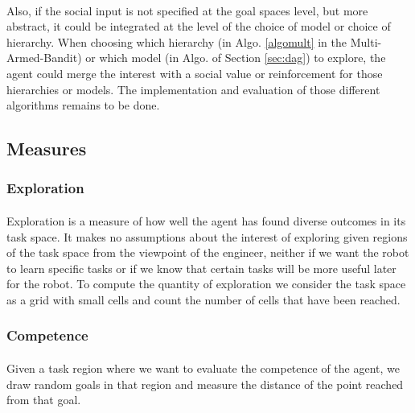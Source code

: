 \documentclass[12pt]{article}
\begin{document}
			\paragraph{}
			Also, if the social input is not specified at the goal spaces level, but more abstract, it could be integrated at the level of the choice of model or choice of hierarchy. 
			When choosing which hierarchy (in Algo. \ref{algomult} in the Multi-Armed-Bandit) or which model (in Algo. of Section \ref{sec:dag}) to explore, the agent could merge the interest with a social
			value or reinforcement for those hierarchies or models. 
			The implementation and evaluation of those different algorithms remains to be done.




	
	\subsection{Measures}

	
		\subsubsection{Exploration}
				
			\paragraph{}
			Exploration is a measure of how well the agent has found diverse outcomes in its task space. 
			It makes no assumptions about the interest of exploring given regions of the task space from the viewpoint of the engineer, 
			neither if we want the robot to learn specific tasks or if we know that certain tasks will be more useful later for the robot.
			To compute the quantity of exploration we consider the task space as a grid with small cells and count the number of cells that have been reached.
		
		
		\subsubsection{Competence}
			\label{sec:competence}
			\paragraph{}
			Given a task region where we want to evaluate the competence of the agent, we draw random goals in that region and measure the distance of
			the point reached from that goal.
		
\end{document}
